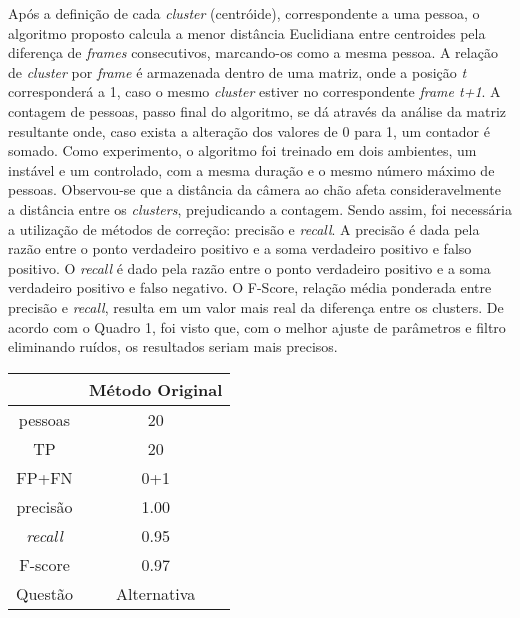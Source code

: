 \documentclass[12pt,oneside,a4paper,chapter=TITLE,section=TITLE,sumario=tradicional]{abntex2}
\begin{document}
Após a definição de cada \textit{cluster} (centróide), correspondente a uma pessoa, o algoritmo proposto calcula a menor distância Euclidiana entre centroides pela diferença de \textit{frames} consecutivos, marcando-os como a mesma pessoa.
A relação de \textit{cluster} por \textit{frame} é armazenada dentro de uma matriz, onde a posição \textit{t} corresponderá a 1, caso o mesmo \textit{cluster} estiver no correspondente \textit{frame t+1}. A contagem de pessoas, passo final do algoritmo, se dá através da análise da matriz resultante onde, caso exista a alteração dos valores de 0 para 1, um contador é somado.
Como experimento, o algoritmo foi treinado em dois ambientes, um instável e um controlado, com a mesma duração e o mesmo número máximo de pessoas. Observou-se que a distância da câmera ao chão afeta consideravelmente a distância entre os \textit{clusters}, prejudicando a contagem. Sendo assim, foi necessária a utilização de métodos de correção: precisão e \textit{recall}. A precisão é dada pela razão entre o ponto verdadeiro positivo e a soma verdadeiro positivo e falso positivo. O \textit{recall} é dado pela razão entre o ponto verdadeiro positivo e a soma verdadeiro positivo e falso negativo. O F-Score, relação média ponderada entre precisão e \textit{recall}, resulta em um valor mais real da diferença entre os clusters.
De acordo com o Quadro 1, foi visto que, com o melhor ajuste de parâmetros e filtro eliminando ruídos, os resultados seriam mais precisos.

\begin{quadro}[htb]
    \begin{tabular}{|c|c|}
        \hline
        \textbf{} & \textbf{Método Original}\\ 
        \hline\hline
        pessoas & 20\\ \hline
        TP  & 20\\ \hline
        FP+FN    & 0+1\\ \hline
        precisão  & 1.00\\ \hline
        \textit{recall}  & 0.95\\ \hline
        F-score & 0.97\\ \hline
        Questão & Alternativa\\ \hline
    \end{tabular}
    
\end{quadro}
\end{document}
